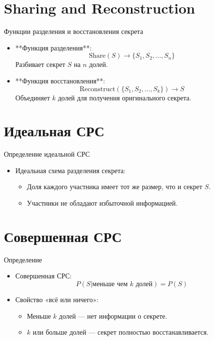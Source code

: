 \documentclass{beamer}
\begin{document}
\section{Sharing and Reconstruction}
\begin{frame}{Функции разделения и восстановления секрета}
    \begin{itemize}
        \item **Функция разделения**:
        \[
        \text{Share}(S) \to \{S_1, S_2, \dots, S_n\}
        \]
        Разбивает секрет \( S \) на \( n \) долей.
        \item **Функция восстановления**:
        \[
        \text{Reconstruct}(\{S_1, S_2, \dots, S_k\}) \to S
        \]
        Объединяет \( k \) долей для получения оригинального секрета.
    \end{itemize}
\end{frame}

\section{Идеальная СРС}
\begin{frame}{Определение идеальной СРС}
    \begin{itemize}
        \item Идеальная схема разделения секрета:
        \begin{itemize}
            \item Доля каждого участника имеет тот же размер, что и секрет \( S \).
            \item Участники не обладают избыточной информацией.
        \end{itemize}
    \end{itemize}
\end{frame}

\section{Совершенная СРС}
\begin{frame}{Определение}
    \begin{itemize}
        \item Совершенная СРС:
        \[
        P(S | \text{меньше чем } k \text{ долей}) = P(S)
        \]
        \item Свойство «всё или ничего»: 
        \begin{itemize}
            \item Меньше \( k \) долей — нет информации о секрете.
            \item \( k \) или больше долей — секрет полностью восстанавливается.
        \end{itemize}
    \end{itemize}
\end{frame}
\end{document}

